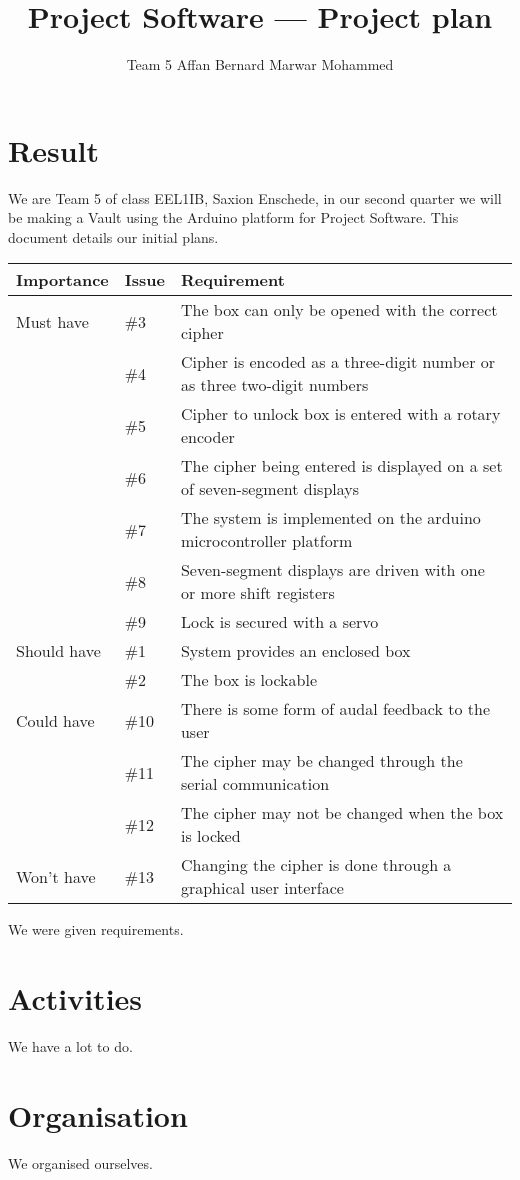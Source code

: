 \documentclass[twoside,a4paper,11pt,titlepage]{report}
\author{ Team 5 Affan Bernard  Marwar Mohammed }
\title{Project Software --- Project plan}
\begin{document}
\maketitle
\tableofcontents
\chapter{Result}
We are Team 5 of class EEL1IB, Saxion Enschede, in our second quarter we will be making a Vault using the Arduino platform for Project Software. This document details our initial plans.

\begin{tabular}[hbp]{lll}
\hline Importance & Issue & Requirement \\ \hline
\hline Must have
& \#3 & The box can only be opened with the correct cipher \\
& \#4 & Cipher is encoded as a three-digit number or as three two-digit numbers \\
& \#5 & Cipher to unlock box is entered with a rotary encoder \\
& \#6 & The cipher being entered is displayed on a set of seven-segment displays \\
& \#7 & The system is implemented on the arduino microcontroller platform \\
& \#8 & Seven-segment displays are driven with one or more shift registers \\
& \#9 & Lock is secured with a servo \\
\hline Should have
& \#1 & System provides an enclosed box \\
& \#2 & The box is lockable \\
\hline Could have
& \#10 & There is some form of audal feedback to the user \\
& \#11 & The cipher may be changed through the serial communication \\
& \#12 & The cipher may not be changed when the box is locked \\
\hline Won't have
& \#13 & Changing the cipher is done through a graphical user interface \\
\hline
\end{tabular}

We were given requirements.
\chapter{Activities}
We have a lot to do.
\chapter{Organisation}
We organised ourselves.
\end{document}

